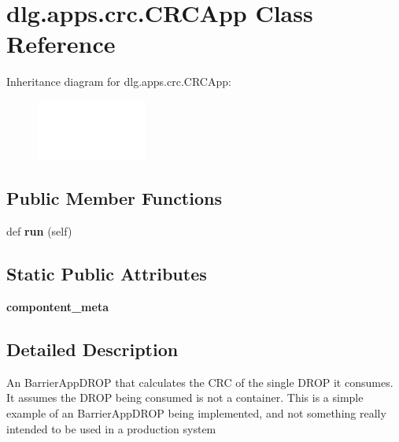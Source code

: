 \hypertarget{classdlg_1_1apps_1_1crc_1_1_c_r_c_app}{}\section{dlg.\+apps.\+crc.\+C\+R\+C\+App Class Reference}
\label{classdlg_1_1apps_1_1crc_1_1_c_r_c_app}
Inheritance diagram for dlg.\+apps.\+crc.\+C\+R\+C\+App\+:\begin{figure}[H]
\begin{center}
\leavevmode
\includegraphics[height=2.000000cm]{classdlg_1_1apps_1_1crc_1_1_c_r_c_app}
\end{center}
\end{figure}
\subsection*{Public Member Functions}
\begin{DoxyCompactItemize}
\item 
\mbox{\label{classdlg_1_1apps_1_1crc_1_1_c_r_c_app_abc26eb2b9ae9dd27b69c41a07a0f08e8}} 
def {\bfseries run} (self)
\end{DoxyCompactItemize}
\subsection*{Static Public Attributes}
\begin{DoxyCompactItemize}
\item 
{\bfseries compontent\+\_\+meta}
\end{DoxyCompactItemize}


\subsection{Detailed Description}
\begin{DoxyVerb}An BarrierAppDROP that calculates the CRC of the single DROP it
consumes. It assumes the DROP being consumed is not a container.
This is a simple example of an BarrierAppDROP being implemented, and
not something really intended to be used in a production system
\end{DoxyVerb}
 

